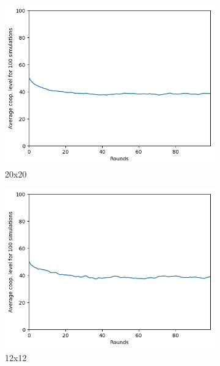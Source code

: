 \documentclass[letterpaper]{article}
\begin{document}
\begin{figure}[H]
    \begin{subfigure}{.5\textwidth}
        \centering
        \includegraphics[width=1\linewidth]{images/assign2/20-part2}
        \caption{20x20}
        \label{fig:20moorepart2}
    \end{subfigure}
    \begin{subfigure}{.5\textwidth}
        \centering
        \includegraphics[width=1\linewidth]{images/assign2/12-part2}
        \caption{12x12}
        \label{fig:12moorepart2}
    \end{subfigure}
    \begin{subfigure}{.5\textwidth}

\end{subfigure}
\end{figure}
\end{document}
